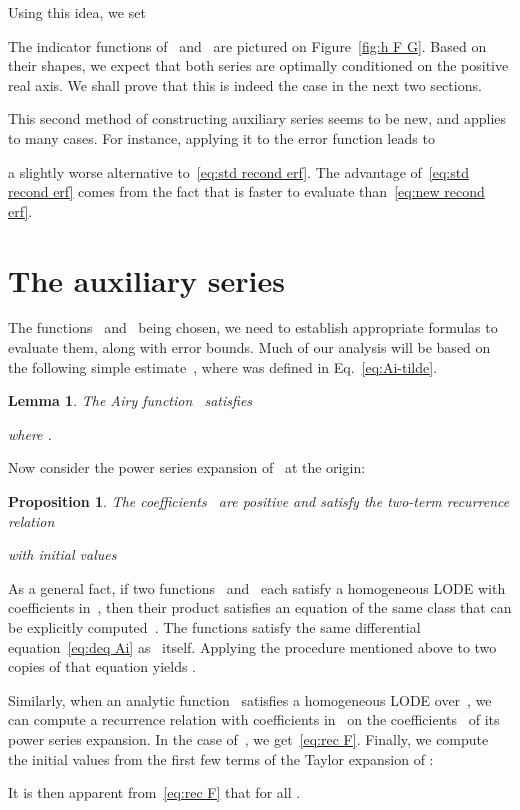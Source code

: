\documentclass[10pt, conference]{IEEEtran}
\newtheorem{lemma}{Lemma}
\newtheorem{proposition}{Proposition}
\begin{document}
Using this idea, we set

The indicator functions of ~and~ are pictured on Figure~\ref{fig:h F G}.
Based on their shapes, we expect that both series are optimally conditioned on
the positive real axis.
We shall prove that this is indeed the case in the
next two sections.

This second method of constructing auxiliary series seems to be new, and applies to many cases.
For instance, applying it to the error function leads to


a slightly worse alternative to~\eqref{eq:std recond erf}.
The advantage of~\eqref{eq:std recond erf} comes from the fact that  is faster to evaluate than~\eqref{eq:new recond erf}.


\section{The auxiliary series~}
\label{sec:F}

The functions ~and~ being chosen, we need to establish appropriate formulas to evaluate them, along with error bounds.
Much of our analysis will be based on the following simple
estimate~{\cite[Chap.~4, {\S}4.1]{Olver1997}}, where  was defined in Eq.~\eqref{eq:Ai-tilde}.

\begin{lemma}
  \label{lem:asympt approx Ai}The Airy function~ satisfies
  
  where
  .
\end{lemma}

Now consider the power series expansion of~ at the origin:


\begin{proposition}
  \label{prop:rec F}The coefficients~ are positive and satisfy the
  two-term recurrence relation
  
  with initial values
  
  
\end{proposition}

\begin{IEEEproof}
  As a general fact, if two functions ~and~ each satisfy a
  homogeneous LODE with coefficients in~, then
  their product  satisfies an equation of the same class that can be explicitly computed~{\cite[Sec.~6.4]{Stanley1999}}.
The functions  satisfy the same
  differential equation~\eqref{eq:deq Ai} as~
  itself. Applying the procedure mentioned above
  to two copies of that equation yields .
  
  Similarly, when an analytic function~ satisfies a homogeneous LODE
  over~, we can compute a recurrence relation with
  coefficients in~ on the coefficients~ of its power
  series expansion.
  In the case of~, we get~\eqref{eq:rec F}. Finally, we
  compute the initial values  from the first few terms of the
  Taylor expansion of :
  
  It is then apparent from~\eqref{eq:rec F} that  for all .
\end{IEEEproof}
\end{document}
